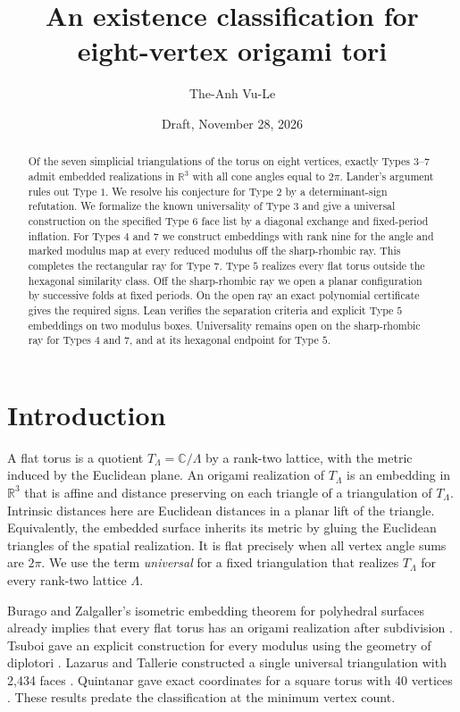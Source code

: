 \documentclass[11pt,letterpaper]{amsart}
\title[Eight-vertex origami tori]{An existence classification for eight-vertex origami tori}
\author{The-Anh Vu-Le}
\date{Draft, November 28, 2026}
\newcommand{\R}{\mathbb R}
\newcommand{\C}{\mathbb C}
\begin{document}
\begin{abstract}
Of the seven simplicial triangulations of the torus on eight vertices,
exactly Types \(3\)--\(7\) admit embedded realizations
in \(\R^3\) with all cone angles equal to \(2\pi\). Lander's argument
rules out Type \(1\). We resolve his conjecture for Type \(2\) by a
determinant-sign refutation. We formalize the known universality of
Type \(3\) and give a universal construction on the specified
Type \(6\) face list by a diagonal exchange and fixed-period inflation.
For Types \(4\) and \(7\) we construct embeddings with rank nine for
the angle and marked modulus map at every reduced modulus off the
sharp-rhombic ray. This completes the rectangular ray for Type \(7\).
Type \(5\) realizes every flat torus outside the hexagonal similarity
class. Off the sharp-rhombic ray we open a planar configuration by
successive folds at fixed periods. On the open ray an exact polynomial
certificate gives the required signs. Lean verifies the separation
criteria and explicit Type \(5\) embeddings on two modulus boxes.
Universality remains open on the sharp-rhombic ray for Types \(4\)
and \(7\), and at its hexagonal endpoint for Type \(5\).
\end{abstract}

\maketitle

\section{Introduction}

A flat torus is a quotient \(T_\Lambda=\C/\Lambda\) by a rank-two
lattice, with the metric induced by the Euclidean plane. An origami
realization of \(T_\Lambda\) is an embedding in \(\R^3\) that is
affine and distance preserving on each triangle of a triangulation of
\(T_\Lambda\). Intrinsic distances here are Euclidean distances in a
planar lift of the triangle. Equivalently, the embedded surface
inherits its metric by gluing the Euclidean triangles of the spatial
realization. It is flat precisely when all vertex angle sums are
\(2\pi\). We use the term \emph{universal} for a fixed triangulation
that realizes \(T_\Lambda\) for every rank-two lattice \(\Lambda\).

Burago and Zalgaller's isometric embedding theorem for
polyhedral surfaces already implies that every flat torus has an
origami realization after subdivision \cite{bz}. Tsuboi gave an
explicit construction for every modulus using the geometry of
diplotori \cite{tsuboi}. Lazarus and Tallerie constructed a single
universal triangulation with 2,434 faces \cite{lt}. Quintanar gave
exact coordinates for a square torus with 40 vertices
\cite{quintanar}. These results predate the classification at the
minimum vertex count.
\end{document}
